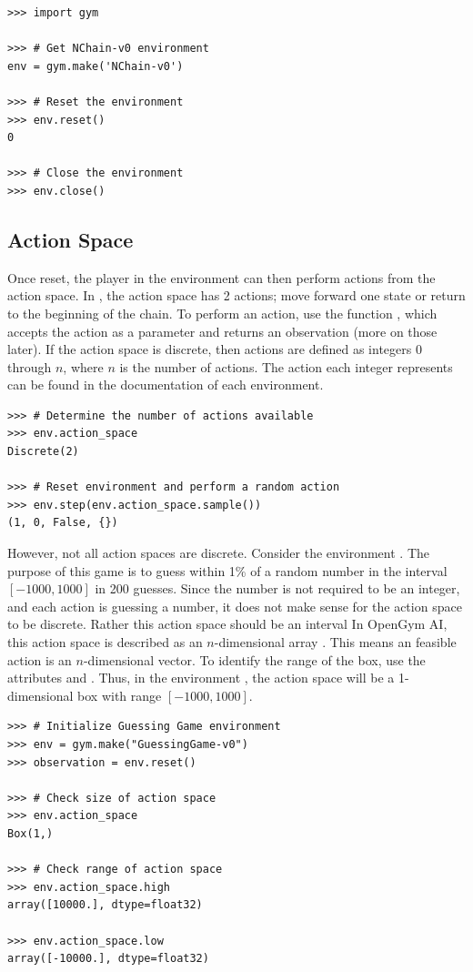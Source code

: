 \begin{lstlisting}
>>> import gym

>>> # Get NChain-v0 environment
env = gym.make('NChain-v0')

>>> # Reset the environment
>>> env.reset()
0

>>> # Close the environment
>>> env.close()
\end{lstlisting}

\subsection*{Action Space}
Once reset, the player in the environment can then perform actions from the action space.
In , the action space has 2 actions; move forward one state or return to the beginning of the chain.
To perform an action, use the function , which accepts the action as a parameter and returns an observation (more on those later).
If the action space is discrete, then actions are defined as integers 0 through $n$, where $n$ is the number of actions.
The action each integer represents can be found in the documentation of each environment.

\begin{lstlisting}
>>> # Determine the number of actions available
>>> env.action_space
Discrete(2)

>>> # Reset environment and perform a random action
>>> env.step(env.action_space.sample())
(1, 0, False, {})
\end{lstlisting} 

However, not all action spaces are discrete.
Consider the environment .
The purpose of this game is to guess within 1\% of a random number in the interval $[-1000,1000]$ in 200 guesses.
Since the number is not required to be an integer, and each action is guessing a number, it does not make sense for the action space to be discrete.
Rather this action space should be an interval
In OpenGym AI, this action space is described as an $n$-dimensional array .
This means an feasible action is an $n$-dimensional vector.
To identify the range of the box, use the attributes  and .
Thus, in the environment , the action space will be a 1-dimensional box with range $[-1000,1000]$.

\begin{lstlisting}
>>> # Initialize Guessing Game environment
>>> env = gym.make("GuessingGame-v0")
>>> observation = env.reset()

>>> # Check size of action space
>>> env.action_space
Box(1,)

>>> # Check range of action space
>>> env.action_space.high
array([10000.], dtype=float32)

>>> env.action_space.low
array([-10000.], dtype=float32)
\end{lstlisting}

